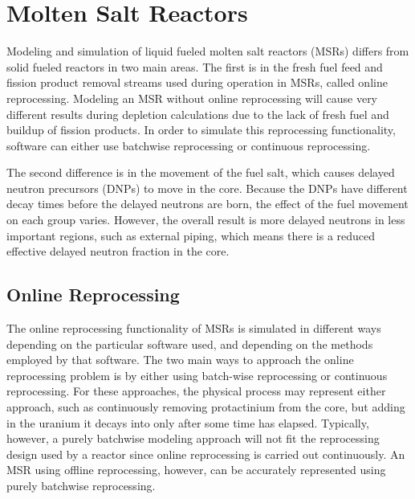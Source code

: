 \renewcommand*\descriptionlabel[1]{\hspace\leftmargin$#1$}
\setcounter{tocdepth}{5}
\setcounter{secnumdepth}{5}
\newcommand{\minus}{\scalebox{0.65}[1.0]{$-$}}

\section{Molten Salt Reactors}

Modeling and simulation of liquid fueled molten salt reactors (MSRs) differs from solid fueled reactors in two main areas. The first is in the fresh fuel feed and fission product removal streams used during operation in MSRs, called online reprocessing. Modeling an MSR without online reprocessing will cause very different results during depletion calculations due to the lack of fresh fuel and buildup of fission products. In order to simulate this reprocessing functionality, software can either use batchwise reprocessing or continuous reprocessing.

The second difference is in the movement of the fuel salt, which causes delayed neutron precursors (DNPs) to move in the core. Because the DNPs have different decay times before the delayed neutrons are born, the effect of the fuel movement on each group varies. However, the overall result is more delayed neutrons in less important regions, such as external piping, which means there is a reduced effective delayed neutron fraction in the core.

\subsection{Online Reprocessing}

The online reprocessing functionality of MSRs is simulated in different ways depending on the particular software used, and depending on the methods employed by that software. The two main ways to approach the online reprocessing problem is by either using batch-wise reprocessing or continuous reprocessing. For these approaches, the physical process may represent either approach, such as continuously removing protactinium from the core, but adding in the uranium it decays into only after some time has elapsed. Typically, however, a purely batchwise modeling approach will not fit the reprocessing design used by a reactor since online reprocessing is carried out continuously. An MSR using offline reprocessing, however, can be accurately represented using purely batchwise reprocessing.

